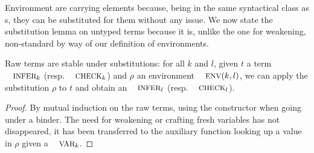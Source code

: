 Environment are carrying \Inferable{} elements because, being in the
same syntactical class as \Var{}s, they can be substituted for them
without any issue. We now state the substitution lemma on untyped terms
because it is, unlike the one for weakening, non-standard by way of our
definition of environments.

\begin{lemma}Raw terms are stable under substitutions: for all $k$ and
$l$, given $t$ a term $\Inferable{k}$ (resp. $\Checkable{k}$) and $ρ$
an environment $\Env{}(k,l)$, we can apply the substitution $ρ$ to $t$
and obtain an $\Inferable{l}$ (resp. $\Checkable{l}$).
\end{lemma}
\begin{proof}By mutual induction on the raw terms, using the \envextend{}
\Env{} constructor when going under a binder. The need for weakening or
crafting fresh variables has not disappeared, it has been transferred to
the auxiliary function looking up a value in $ρ$ given a $\Var{k}$.
\end{proof}

